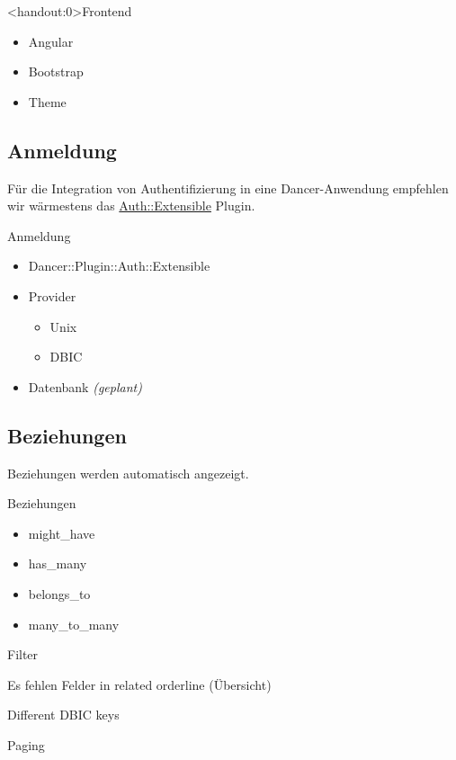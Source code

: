 \begin{frame}<handout:0>{Frontend}
\begin{itemize}
\item Angular
\item Bootstrap
\item Theme
\end{itemize}
\end{frame}

\subsection{Anmeldung}

Für die Integration von Authentifizierung in eine Dancer-Anwendung empfehlen
wir wärmestens das
\href{https://metacpan.org/pod/Dancer::Plugin::Auth::Extensible}{Auth::Extensible}
Plugin.

\begin{frame}{Anmeldung}
\begin{itemize}
\item Dancer::Plugin::Auth::Extensible
\item Provider
\begin{itemize}
\item Unix
\item DBIC
\end{itemize}
\item Datenbank \textit{(geplant)}
\end{itemize}
\end{frame}

\subsection{Beziehungen}

Beziehungen werden automatisch angezeigt.

\begin{frame}{Beziehungen}
\begin{itemize}
\item might\_have
\item has\_many
\item belongs\_to
\item many\_to\_many
\end{itemize}
\end{frame}

Filter

Es fehlen Felder in related orderline (Übersicht)

Different DBIC keys

Paging

